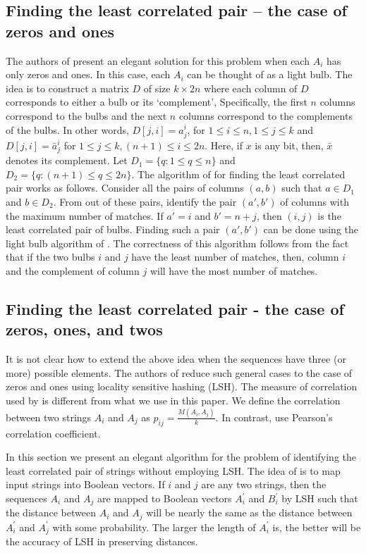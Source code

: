 \documentclass{article}
\theoremstyle{definition}
\theoremstyle{remark}
\begin{document}
\subsection{Finding the least correlated pair -- the case of zeros and ones}
 The authors of \cite{PBK11} present an elegant solution for this problem when each $A_i$ has only zeros and ones. In this case, each $A_i$ can be thought of as a light bulb. The idea is to construct a matrix $D$ of size $k\times 2n$ where each column of $D$ corresponds to either a bulb or its `complement', Specifically, the first $n$ columns correspond to the bulbs and the next $n$ columns correspond to the complements of the bulbs. In other words, $D[j,i]=a_j^i$, for $1\leq i\leq n, 1\leq j\leq k$ and $D[j,i]=\bar{a}_j^i$ for $1\leq j\leq k,(n+1)\leq i\leq 2n$. Here, if $x$ is any bit, then, $\bar{x}$ denotes its complement. Let $D_1=\{q:1\leq q\leq n\}$ and $D_2=\{q:(n+1)\leq q\leq 2n\}$. The algorithm of \cite{PBK11} for finding the least correlated pair works as follows. Consider all the pairs of columns $(a,b)$ such that $a\in D_1$ and $b\in D_2$. From out of these pairs, identify the pair $(a',b')$ of columns with the maximum number of matches.  If $a'=i$ and $b'=n+j$, then $(i,j)$ is the least correlated pair of bulbs. Finding such a pair $(a',b')$ can be done using the light bulb algorithm of \cite{RSJ89}. The correctness of this algorithm follows from the fact that if the two bulbs $i$ and $j$ have the least number of matches, then, column $i$ and the complement of column $j$ will have the most number of matches.

\subsection{Finding the least correlated pair - the case of zeros, ones, and twos}\label{mapping}
 It is not clear how to extend the above idea when the sequences have three (or more) possible elements. The authors of \cite{PBK11} reduce such general cases to the case of zeros and ones using locality sensitive hashing (LSH).
 The measure of correlation used by \cite{PBK11} is different from what we use in this paper. We define the correlation between two strings $A_i$ and $A_j$ as $p_{ij}=\frac{M(A_i,A_j)}{k}$. In contrast, \cite{PBK11} use Pearson's correlation coefficient.



 In this section we present an elegant algorithm for the problem of identifying the least correlated pair of strings without employing LSH. The idea of \cite{PBK11} is to map input strings into Boolean vectors. If $i$ and $j$ are any two strings, then the sequences $A_i$ and $A_j$ are mapped to Boolean vectors $A_i^\prime$ and $B_i^\prime$ by LSH such that the distance between $A_i$ and $A_j$ will be nearly the same as the distance between $A_i^\prime$ and $A_j^\prime$ with some probability. The larger the length of $A_i^\prime$ is, the better will be the accuracy of LSH in preserving distances.
\end{document}

